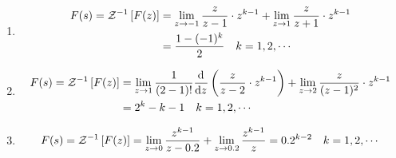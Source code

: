 \begin{exercise} %
    \begin{enumerate}
        \item \begin{align*}
            F(s) = {\mathcal{Z}}^{-1}\left[F(z)\right] &= \lim_{z \to -1} \frac{z}{z-1} \cdot z^{k-1} + \lim_{z \to 1} \frac{z}{z+1} \cdot z^{k-1} \\
            &= \frac{1-(-1)^k}{2} \quad k = 1, 2, \cdots
        \end{align*}
        \item \begin{align*}
            F(s) = {\mathcal{Z}}^{-1}\left[F(z)\right] &= \lim_{z \to 1} \frac{1}{(2-1)!} \frac{{\rm{d}}^{}}{{\rm{d}}{z}^{}} \left(\frac{z}{z-2} \cdot z^{k-1}\right) + \lim_{z \to 2} \frac{z}{(z-1)^2} \cdot z^{k-1} \\
            &= 2^k - k - 1 \quad k = 1, 2, \cdots
        \end{align*}
        \item \begin{equation*}
            F(s) = {\mathcal{Z}}^{-1}\left[F(z)\right] = \lim_{z \to 0} \frac{z^{k-1}}{z-0.2} + \lim_{z \to 0.2} \frac{z^{k-1}}{z} = 0.2^{k-2} \quad k = 1, 2, \cdots
        \end{equation*}
    \end{enumerate}
\end{exercise}

